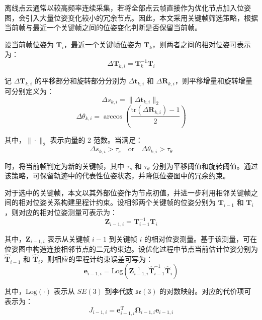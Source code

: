 离线点云通常以较高频率连续采集，若将全部点云帧直接作为优化节点加入位姿图，会引入大量位姿变化较小的冗余节点。因此，本文采用关键帧筛选策略，根据当前帧与最近一个关键帧之间的位姿变化判断是否保留当前帧。

设当前帧位姿为 $\mathbf{T}_i$，最近一个关键帧位姿为 $\mathbf{T}_k$，则两者之间的相对位姿可表示为：
\begin{equation}
\Delta \mathbf{T}_{k,i}=\mathbf{T}_k^{-1}\mathbf{T}_i
\end{equation}

记 $\Delta \mathbf{T}_{k,i}$ 的平移部分和旋转部分分别为 $\Delta \mathbf{t}_{k,i}$ 和 $\Delta \mathbf{R}_{k,i}$，则平移增量和旋转增量可分别定义为：
\begin{equation}
\Delta s_{k,i}=\|\Delta \mathbf{t}_{k,i}\|_2
\end{equation}
\begin{equation}
\Delta \theta_{k,i}=\arccos\left(\frac{\mathrm{tr}(\Delta \mathbf{R}_{k,i})-1}{2}\right)
\end{equation}

其中，$\|\cdot\|_2$ 表示向量的 2 范数。当满足：
\begin{equation}
\Delta s_{k,i}>\tau_s \quad \text{or} \quad \Delta \theta_{k,i}>\tau_\theta
\end{equation}

时，将当前帧判定为新的关键帧，其中 $\tau_s$ 和 $\tau_\theta$ 分别为平移阈值和旋转阈值。通过该策略，可保留轨迹中的代表性位姿状态，并降低位姿图中的冗余约束。

对于选中的关键帧，本文以其外部位姿作为节点初值，并进一步利用相邻关键帧之间的相对位姿关系构建里程计约束。设相邻两个关键帧的位姿分别为 $\mathbf{T}_{i-1}$ 和 $\mathbf{T}_i$，则对应的相对位姿测量可表示为：
\begin{equation}
\mathbf{Z}_{i-1,i}=\mathbf{T}_{i-1}^{-1}\mathbf{T}_i
\end{equation}

其中，$\mathbf{Z}_{i-1,i}$ 表示从关键帧 $i-1$ 到关键帧 $i$ 的相对位姿测量。基于该测量，可在位姿图中构造连接相邻节点的二元约束边。设优化过程中节点当前估计位姿分别为 $\hat{\mathbf{T}}_{i-1}$ 和 $\hat{\mathbf{T}}_i$，则相应的里程计约束误差可写为：
\begin{equation}
\mathbf{e}_{i-1,i}
=
\mathrm{Log}
\left(
\mathbf{Z}_{i-1,i}^{-1}
\hat{\mathbf{T}}_{i-1}^{-1}
\hat{\mathbf{T}}_i
\right)
\end{equation}

其中，$\mathrm{Log}(\cdot)$ 表示从 $SE(3)$ 到李代数 $\mathfrak{se}(3)$ 的对数映射。对应的代价项可表示为：
\begin{equation}
J_{i-1,i}
=
\mathbf{e}_{i-1,i}^{\mathrm{T}}
\boldsymbol{\Omega}_{i-1,i}
\mathbf{e}_{i-1,i}
\end{equation}

